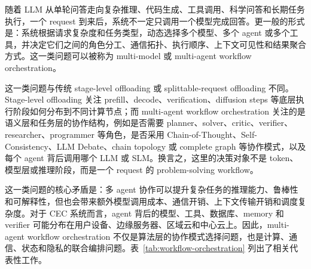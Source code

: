 随着 LLM 从单轮问答走向复杂推理、代码生成、工具调用、科学问答和长期任务执行，一个 request 到来后，系统不一定只调用一个模型完成回答。更一般的形式是：系统根据请求复杂度和任务类型，动态选择多个模型、多个 agent 或多个工具，并决定它们之间的角色分工、通信拓扑、执行顺序、上下文可见性和结果聚合方式。这一类问题可以被称为 multi-model 或 multi-agent workflow orchestration。


这一类问题与传统 stage-level offloading 或 splittable-request offloading 不同。Stage-level offloading 关注 prefill、decode、verification、diffusion steps 等底层执行阶段如何分布到不同计算节点；而 multi-agent workflow orchestration 关注的是语义层和任务层的协作结构，例如是否需要 planner、solver、critic、verifier、researcher、programmer 等角色，是否采用 Chain-of-Thought、Self-Consistency、LLM Debate、chain topology 或 complete graph 等协作模式，以及每个 agent 背后调用哪个 LLM 或 SLM。换言之，这里的决策对象不是 token、模型层或推理阶段，而是一个 request 的 problem-solving workflow。


这一类问题的核心矛盾是：多 agent 协作可以提升复杂任务的推理能力、鲁棒性和可解释性，但也会带来额外模型调用成本、通信开销、上下文传输开销和调度复杂度。对于 CEC 系统而言，agent 背后的模型、工具、数据库、memory 和 verifier 可能分布在用户设备、边缘服务器、区域云和中心云上。因此，multi-agent workflow orchestration 不仅是算法层的协作模式选择问题，也是计算、通信、状态和隐私的联合编排问题。表~\ref{tab:workflow-orchestration} 列出了相关代表性工作。


